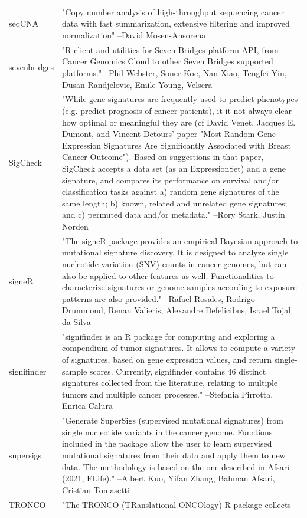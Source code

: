 \documentclass[]{article}
\begin{document}
\begin{longtable}[t]{l>{\raggedright\arraybackslash}p{25em}}
seqCNA & "Copy number analysis of high-throughput sequencing cancer
data with fast summarization, extensive filtering and improved
normalization" --David Mosen-Ansorena\\
sevenbridges & "R client and utilities for Seven Bridges platform API,
from Cancer Genomics Cloud to other Seven Bridges supported
platforms." --Phil Webster, Soner Koc, Nan Xiao, Tengfei Yin, Dusan Randjelovic, Emile Young, Velsera\\
SigCheck & "While gene signatures are frequently used to predict
phenotypes (e.g. predict prognosis of cancer patients), it it
not always clear how optimal or meaningful they are (cf David
Venet, Jacques E. Dumont, and Vincent Detours' paper "Most
Random Gene Expression Signatures Are Significantly Associated
with Breast Cancer Outcome"). Based on suggestions in that
paper, SigCheck accepts a data set (as an ExpressionSet) and a
gene signature, and compares its performance on survival and/or
classification tasks against a) random gene signatures of the
same length; b) known, related and unrelated gene signatures;
and c) permuted data and/or metadata." --Rory Stark, Justin Norden\\
signeR & "The signeR package provides an empirical Bayesian approach
to mutational signature discovery. It is designed to analyze
single nucleotide variation (SNV) counts in cancer genomes, but
can also be applied to other features as well. Functionalities
to characterize signatures or genome samples according to
exposure patterns are also provided." --Rafael Rosales, Rodrigo Drummond, Renan Valieris, Alexandre Defelicibus, Israel Tojal da Silva\\
signifinder & "signifinder is an R package for computing and exploring a
compendium of tumor signatures. It allows to compute a variety
of signatures, based on gene expression values, and return
single-sample scores. Currently, signifinder contains 46
distinct signatures collected from the literature, relating to
multiple tumors and multiple cancer processes." --Stefania Pirrotta, Enrica Calura\\
\addlinespace
supersigs & "Generate SuperSigs (supervised mutational signatures) from
single nucleotide variants in the cancer genome. Functions
included in the package allow the user to learn supervised
mutational signatures from their data and apply them to new
data. The methodology is based on the one described in Afsari
(2021, ELife)." --Albert Kuo, Yifan Zhang, Bahman Afsari, Cristian Tomasetti\\
TRONCO & "The TRONCO (TRanslational ONCOlogy) R package collects

\end{longtable}
\end{document}
